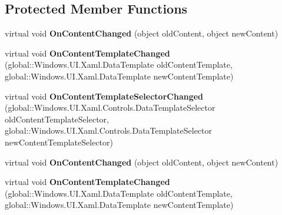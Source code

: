 \subsection*{Protected Member Functions}
\begin{DoxyCompactItemize}
\item 
\mbox{\label{class_windows_1_1_u_i_1_1_xaml_1_1_controls_1_1_content_control_ad866ceae79da192e052f451b2a2070a1}} 
virtual void {\bfseries On\+Content\+Changed} (object old\+Content, object new\+Content)
\item 
\mbox{\label{class_windows_1_1_u_i_1_1_xaml_1_1_controls_1_1_content_control_af0e4eade7bb6b73242fbc48c0be8761f}} 
virtual void {\bfseries On\+Content\+Template\+Changed} (global\+::\+Windows.\+U\+I.\+Xaml.\+Data\+Template old\+Content\+Template, global\+::\+Windows.\+U\+I.\+Xaml.\+Data\+Template new\+Content\+Template)
\item 
\mbox{\label{class_windows_1_1_u_i_1_1_xaml_1_1_controls_1_1_content_control_a814a04f46ae960523984ba3c434f195c}} 
virtual void {\bfseries On\+Content\+Template\+Selector\+Changed} (global\+::\+Windows.\+U\+I.\+Xaml.\+Controls.\+Data\+Template\+Selector old\+Content\+Template\+Selector, global\+::\+Windows.\+U\+I.\+Xaml.\+Controls.\+Data\+Template\+Selector new\+Content\+Template\+Selector)
\item 
\mbox{\label{class_windows_1_1_u_i_1_1_xaml_1_1_controls_1_1_content_control_ad866ceae79da192e052f451b2a2070a1}} 
virtual void {\bfseries On\+Content\+Changed} (object old\+Content, object new\+Content)
\item 
\mbox{\label{class_windows_1_1_u_i_1_1_xaml_1_1_controls_1_1_content_control_af0e4eade7bb6b73242fbc48c0be8761f}} 
virtual void {\bfseries On\+Content\+Template\+Changed} (global\+::\+Windows.\+U\+I.\+Xaml.\+Data\+Template old\+Content\+Template, global\+::\+Windows.\+U\+I.\+Xaml.\+Data\+Template new\+Content\+Template)
\item 
\mbox{\label{class_windows_1_1_u_i_1_1_xaml_1_1_controls_1_1_content_control_a814a04f46ae960523984ba3c434f195c}} 

\end{DoxyCompactItemize}
